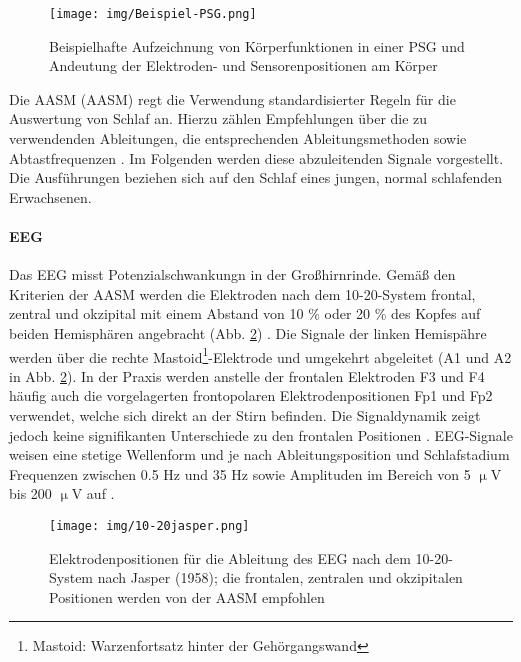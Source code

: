 \begin{figure}[H]
	\centering
	\texttt{[image: img/Beispiel-PSG.png]}
	\caption[Beispielhafte \acs{PSG}]{Beispielhafte Aufzeichnung von Körperfunktionen in einer \acs{PSG} und Andeutung der Elektroden- und Sensorenpositionen am Körper \parencite{penzel_schlafstorungen_2005}}
	\label{fig:beispiel-psg}
\end{figure}

Die \acl{AASM} (\acs{AASM}) regt die Verwendung standardisierter Regeln für die Auswertung von Schlaf an. Hierzu zählen Empfehlungen über die zu verwendenden Ableitungen, die entsprechenden Ableitungsmethoden sowie Abtastfrequenzen \parencite{iber_aasm_2007}. Im Folgenden werden diese abzuleitenden Signale vorgestellt. Die Ausführungen beziehen sich auf den Schlaf eines jungen, normal schlafenden Erwachsenen.\\

\paragraph{\acs{EEG}}
Das \acs{EEG} misst Potenzialschwankungn in der Großhirnrinde. Gemäß den Kriterien der \acs{AASM} werden die Elektroden nach dem 10-20-System frontal, zentral und okzipital mit einem Abstand von 10 \% oder 20 \% des Kopfes auf beiden Hemisphären angebracht (Abb. \ref{fig:10-20jasper}) \parencite{iber_aasm_2007}. Die Signale der linken Hemispähre werden über die rechte Mastoid\footnote{Mastoid: Warzenfortsatz hinter der Gehörgangswand}-Elektrode und umgekehrt abgeleitet (A1 und A2 in Abb. \ref{fig:10-20jasper}). In der Praxis werden anstelle der frontalen Elektroden F3 und F4 häufig auch die vorgelagerten frontopolaren Elektrodenpositionen Fp1 und Fp2 verwendet, welche sich direkt an der Stirn befinden. Die Signaldynamik zeigt jedoch keine signifikanten Unterschiede zu den frontalen Positionen \parencite{dorffner_effects_2015}. \acs{EEG}-Signale weisen eine stetige Wellenform und je nach Ableitungsposition und Schlafstadium Frequenzen zwischen 0.5 Hz und 35 Hz sowie Amplituden im Bereich von 5 $\upmu$V bis 200 $\upmu$V auf \parencite{lee-chiong_sleep_2008}.

\begin{figure}[H]
	\centering
	\texttt{[image: img/10-20jasper.png]}
	\caption[Elektrodenpositionen des \acs{EEG}]{Elektrodenpositionen für die Ableitung des \acs{EEG} nach dem 10-20-System nach Jasper (1958); die frontalen, zentralen und okzipitalen Positionen werden von der \acs{AASM} empfohlen \parencite{kemp_edf+:_????}}
	\label{fig:10-20jasper}
\end{figure}

